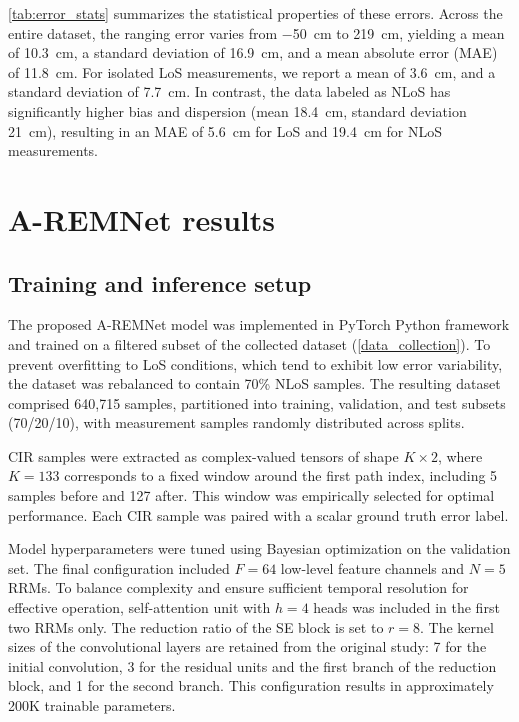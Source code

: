 \autoref{tab:error_stats} summarizes the statistical properties of these errors. Across the entire dataset, the ranging error varies from \SI{-50}{\centi\metre} to \SI{219}{\centi\metre}, yielding a mean of \SI{10.3}{\centi\metre}, a standard deviation of \SI{16.9}{\centi\metre}, and a mean absolute error (MAE) of \SI{11.8}{\centi\metre}. For isolated LoS measurements, we report a mean of \SI{3.6}{\centi\metre}, and a standard deviation of \SI{7.7}{\centi\metre}. In contrast, the data labeled as NLoS has significantly higher bias and dispersion (mean \SI{18.4}{\centi\metre}, standard deviation \SI{21}{\centi\metre}), resulting in an MAE of \SI{5.6}{\centi\metre} for LoS and \SI{19.4}{\centi\metre} for NLoS measurements.


\section{A-REMNet results}

\subsection{Training and inference setup}
The proposed A-REMNet model was implemented in PyTorch Python framework and trained on a filtered subset of the collected dataset (\autoref{data_collection}). To prevent overfitting to LoS conditions, which tend to exhibit low error variability, the dataset was rebalanced to contain 70\% NLoS samples. The resulting dataset comprised 640{,}715 samples, partitioned into training, validation, and test subsets (70/20/10), with measurement samples randomly distributed across splits.

CIR samples were extracted as complex-valued tensors of shape $K \times 2$, where $K = 133$ corresponds to a fixed window around the first path index, including 5 samples before and 127 after. This window was empirically selected for optimal performance. Each CIR sample was paired with a scalar ground truth error label.

Model hyperparameters were tuned using Bayesian optimization on the validation set. The final configuration included $F = 64$ low-level feature channels and $N = 5$ RRMs. To balance complexity and ensure sufficient temporal resolution for effective operation, self-attention unit with $h = 4$ heads was included in the first two RRMs only. The reduction ratio of the SE block is set to $r = 8$. The kernel sizes of the convolutional layers are retained from the original study: 7 for the initial convolution, 3 for the residual units and the first branch of the reduction block, and 1 for the second branch. This configuration results in approximately 200K trainable parameters.

